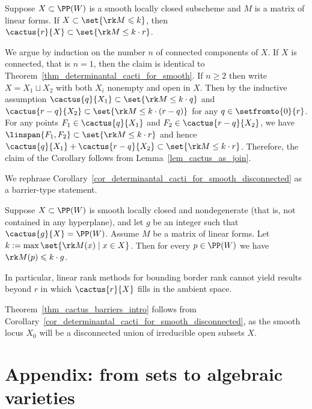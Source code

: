 \documentclass[12pt,a4paper]{article}
\begin{document}
\begin{cor}
   \label{cor_determinantal_cacti_for_smooth_disconnected}
   Suppose $X\subset \PP(W)$ is a smooth locally closed subscheme  and $M$ is a matrix of linear forms.
   If $X\subset \set{\rk M \leqslant k}$,
   then $\cactus{r}{X} \subset \set{\rk M \le k \cdot r}$.
\end{cor}
\begin{prf}
   We argue by induction on the number $n$ of connected components of $X$.
   If $X$ is connected, that is $n=1$, then the claim is identical to Theorem~\ref{thm_determinantal_cacti_for_smooth}.
   If $n\geqslant 2$ then write $X= X_1 \sqcup X_2$ with both $X_i$ nonempty and open in $X$.
   Then by the inductive assumption
   $\cactus{q}{X_1} \subset \set{\rk M \le k \cdot q}$ and
   $\cactus{r-q}{X_2} \subset \set{\rk M \le k \cdot (r-q)}$ for any $q \in \setfromto{0}{r}$.
   For any points
   $F_1\in \cactus{q}{X_1}$ and $F_2 \in \cactus{r-q}{X_2}$,
   we have $\linspan{F_1, F_2} \subset \set{\rk M \le k \cdot r}$
   and hence $\cactus{q}{X_1}+\cactus{r-q}{X_2} \subset \set{\rk M \le k \cdot r}$.
   Therefore, the claim of the Corollary follows from Lemma~\ref{lem_cactus_as_join}.
\end{prf}

We rephrase Corollary~\ref{cor_determinantal_cacti_for_smooth_disconnected} as a barrier-type statement.

\begin{cor}
   Suppose $X\subset \PP(W)$ is smooth locally closed and nondegenerate (that is, not contained in any hyperplane),
   and let $g$ be an integer such that $\cactus{g}{X}=\PP (W)$.
   Assume $M$ be a matrix of linear forms.
   Let $k:=\max\set{\rk M(x) \mid x\in X}$.
   Then for every $p\in \PP(W)$ we have $\rk M(p)  \leqslant k \cdot g$.
\end{cor}
In particular, linear rank methods for bounding border rank cannot yield results beyond $r$ in which $\cactus{r}{X}$ fills in the ambient space.


Theorem~\ref{thm_cactus_barriers_intro} follows from Corollary~\ref{cor_determinantal_cacti_for_smooth_disconnected}, as the smooth locus $X_0$ will be a disconnected union of irreducible open subsets $X$.

\appendix
\section{Appendix: from sets to algebraic varieties}
\label{sec_appendix}
\end{document}
